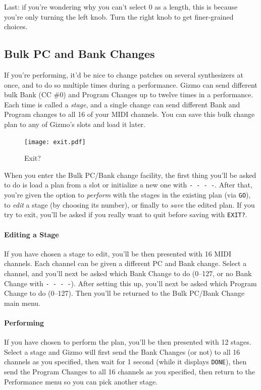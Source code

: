 \documentclass{article}
\begin{document}
Last: if you're wondering why you can't select 0 as a length, this is because you're only turning the left knob.  Turn the right knob to get finer-grained choices.

\subsection{Bulk PC and Bank Changes}
\label{bulkpc}

If you're performing, it'd be nice to change patches on several synthesizers at once, and to do so multiple times during a performance.  Gizmo can send different bulk Bank (CC \#0) and Program Changes up to twelve times in a performance.  Each time is called a {\it stage}, and a single change can send different Bank and Program changes to all 16 of your MIDI channels.  You can save this bulk change plan to any of Gizmo's slots and load it later.

\begin{figure}
\vspace{-1em}
\texttt{[image: exit.pdf]}
\caption{Exit?}
\vspace{-1em}
\end{figure}

When you enter the Bulk PC/Bank change facility, the first thing you'll be asked to do is load a plan from a slot or initialize a new one with \texttt{-~-~-~-}.  After that, you're given the option to {\it perform} with the stages in the existing plan (via \texttt{GO}), to {\it edit} a stage (by choosing its number), or finally to {\it save} the edited plan.  If you try to exit, you'll be asked if you really want to quit before saving with {\texttt{EXIT?}}.

\paragraph{Editing a Stage}
If you have chosen a stage to edit, you'll be then presented with 16 MIDI channels. Each channel can be given a different PC and Bank change.  Select a channel, and you'll next be asked which Bank Change to do (0--127, or no Bank Change with \texttt{-~-~-~-}).  After setting this up, you'll next be asked which Program Change to do (0--127).   Then you'll be returned to the Bulk PC/Bank Change main menu.

\paragraph{Performing}
If you have chosen to perform the plan, you'll be then presented with 12 stages. Select a stage and Gizmo will first send the Bank Changes (or not) to all 16 channels as you specified, then wait for 1 second (while it displays \texttt{DONE}), then send the Program Changes to all 16 channels as you specified, then return to the Performance menu so you can pick another stage.
\end{document}
